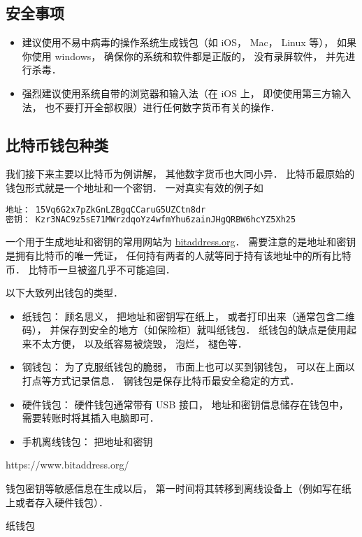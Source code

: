 
\subsection{安全事项}
\begin{itemize}
\item 建议使用不易中病毒的操作系统生成钱包（如 iOS， Mac， Linux 等）， 如果你使用 windows， 确保你的系统和软件都是正版的， 没有录屏软件， 并先进行杀毒．
\item 强烈建议使用系统自带的浏览器和输入法（在 iOS 上， 即使使用第三方输入法， 也不要打开全部权限）进行任何数字货币有关的操作．
\end{itemize}

\subsection{比特币钱包种类}
我们接下来主要以比特币为例讲解， 其他数字货币也大同小异． 比特币最原始的钱包形式就是一个地址和一个密钥． 一对真实有效的例子如
\begin{lstlisting}[language=bash]
地址： 15Vq6G2x7pZkGnLZBgqCCaruG5UZCtn8dr
密钥： Kzr3NAC9z5sE71MWrzdqoYz4wfmYhu6zainJHgQRBW6hcYZ5Xh25
\end{lstlisting}
一个用于生成地址和密钥的常用网站为 \href{https://www.bitaddress.org/}{bitaddress.org}． 需要注意的是地址和密钥是拥有比特币的唯一凭证， 任何持有两者的人就等同于持有该地址中的所有比特币． 比特币一旦被盗几乎不可能追回．

以下大致列出钱包的类型．
\begin{itemize}
\item 纸钱包： 顾名思义， 把地址和密钥写在纸上， 或者打印出来（通常包含二维码）， 并保存到安全的地方（如保险柜）就叫纸钱包． 纸钱包的缺点是使用起来不太方便， 以及纸容易被烧毁， 泡烂， 褪色等．
\item 钢钱包： 为了克服纸钱包的脆弱， 市面上也可以买到钢钱包， 可以在上面以打点等方式记录信息． 钢钱包是保存比特币最安全稳定的方式．
\item 硬件钱包： 硬件钱包通常带有 USB 接口， 地址和密钥信息储存在钱包中， 需要转账时将其插入电脑即可．
\item 手机离线钱包： 把地址和密钥
\end{itemize}



https://www.bitaddress.org/


钱包密钥等敏感信息在生成以后， 第一时间将其转移到离线设备上（例如写在纸上或者存入硬件钱包）．

纸钱包

